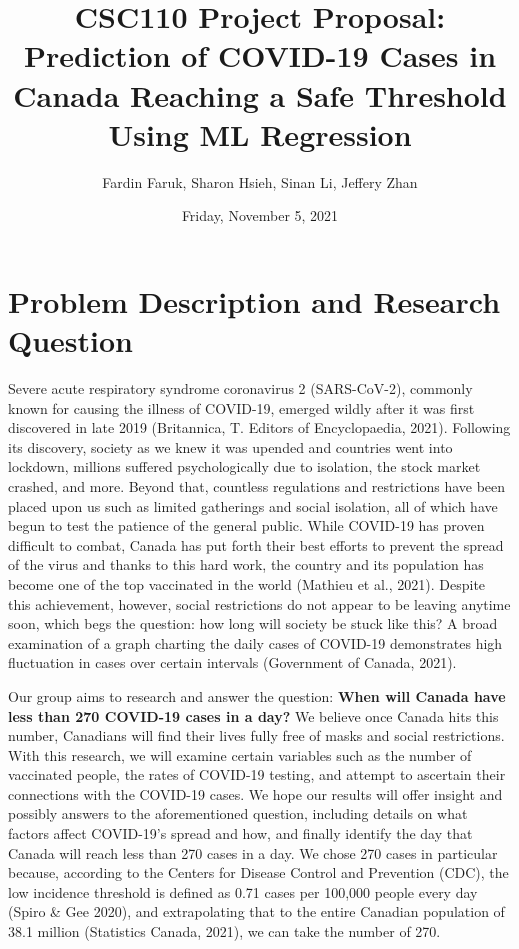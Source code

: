 \documentclass[fontsize=11pt]{article}
\title{CSC110 Project Proposal: Prediction of COVID-19 Cases in Canada Reaching a Safe Threshold Using ML Regression}
\author{Fardin Faruk, Sharon Hsieh, Sinan Li, Jeffery Zhan}
\date{Friday, November 5, 2021}
\begin{document}
    \maketitle

    \section*{Problem Description and Research Question}

    Severe acute respiratory syndrome coronavirus 2 (SARS-CoV-2), commonly known for causing the illness of COVID-19, emerged wildly after it was first discovered in late 2019 (Britannica, T. Editors of Encyclopaedia, 2021). Following its discovery, society as we knew it was upended and countries went into lockdown, millions suffered psychologically due to isolation, the stock market crashed, and more. Beyond that, countless regulations and restrictions have been placed upon us such as limited gatherings and social isolation, all of which have begun to test the patience of the general public. While COVID-19 has proven difficult to combat, Canada has put forth their best efforts to prevent the spread of the virus and thanks to this hard work, the country and its population has become one of the top vaccinated in the world (Mathieu et al., 2021). Despite this achievement, however, social restrictions do not appear to be leaving anytime soon, which begs the question: how long will society be stuck like this? A broad examination of a graph charting the daily cases of COVID-19 demonstrates high fluctuation in cases over certain intervals (Government of Canada, 2021).

    Our group aims to research and answer the question: \textbf{When will Canada have less than 270 COVID-19 cases in a day?} We believe once Canada hits this number, Canadians will find their lives fully free of masks and social restrictions. With this research, we will examine certain variables such as the number of vaccinated people, the rates of COVID-19 testing, and attempt to ascertain their connections with the COVID-19 cases. We hope our results will offer insight and possibly answers to the aforementioned question, including details on what factors affect COVID-19’s spread and how, and finally identify the day that Canada will reach less than 270 cases in a day. We chose 270 cases in particular because, according to the Centers for Disease Control and Prevention (CDC), the low incidence threshold is defined as 0.71 cases per 100,000 people every day (Spiro \& Gee 2020), and extrapolating that to the entire Canadian population of 38.1 million (Statistics Canada, 2021), we can take the number of 270.
\end{document}

